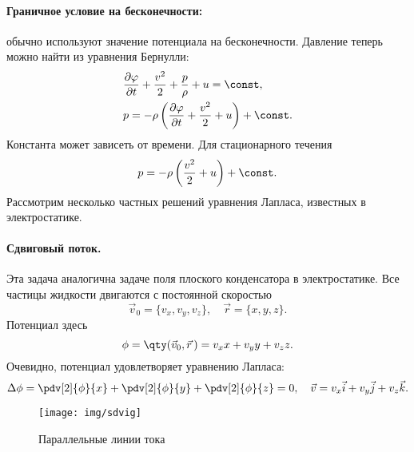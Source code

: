 \paragraph{Граничное условие на бесконечности:}\hspace{-1em} обычно используют значение потенциала на бесконечности.
\vskip 0.75cm
Давление теперь можно найти из уравнения Бернулли:
\begin{equation}
\begin{aligned}
& \frac { \partial \varphi } { \partial t } + \frac { v^2 } { 2 } + \frac { p } { \rho } + u =  \const,  \\
& p = - \rho\left( \frac { \partial \varphi } { \partial t } + \frac { v^2 } { 2 } + u \right) +  \const.
\end{aligned}
\end{equation}
Константа может зависеть от времени. Для стационарного течения
\begin{equation}
p = - \rho\left( \frac { v^2 } { 2 } + u \right) +  \const.
\end{equation}
Рассмотрим несколько частных решений уравнения Лапласа, известных в  электростатике.

\paragraph{Сдвиговый поток.} Эта задача аналогична задаче поля плоского конденсатора в электростатике. Все частицы жидкости двигаются с постоянной скоростью
\begin{equation}
    \vec{v}_0 = \{v_x, v_y, v_z\}, \quad
    \vec{r} = \{x,y,z\}.
\end{equation}
Потенциал здесь
\begin{equation}
    \phi = \qty(\vec{v}_0,\vec{r}\,) = v_x x + v_y y + v_z z.
\end{equation}
Очевидно, потенциал удовлетворяет уравнению Лапласа:
\begin{equation}
    \Delta \phi = \pdv[2]{\phi}{x}+ \pdv[2]{\phi}{y} + \pdv[2]{\phi}{z}=0, \quad
    \vec{v} = v_x \vec{i} + v_y \vec{j} + v_z \vec{k}.
\end{equation}
\begin{figure}[H]
    \centering
    \texttt{[image: img/sdvig]}
    \caption{Параллельные линии тока}
    \label{fig:sdvigovuipotok}
\end{figure}

